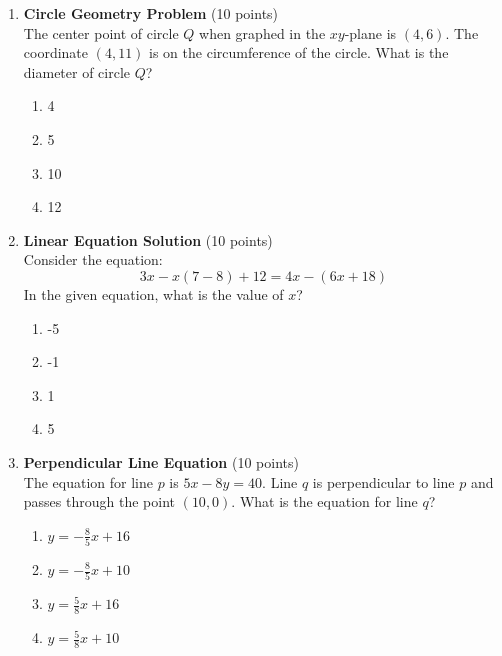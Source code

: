 \begin{enumerate}
  \item \textbf{Circle Geometry Problem} (10 points)\\
  The center point of circle $Q$ when graphed in the $xy$-plane is $(4,6)$. The coordinate $(4,11)$ is on the circumference of the circle. What is the diameter of circle $Q$?
  \begin{enumerate}[label=(\Alph*)]
    \item 4
    \item 5
    \item 10
    \item 12
  \end{enumerate}
  \begin{subanswer}
  \end{subanswer}

  \item \textbf{Linear Equation Solution} (10 points)\\
  Consider the equation:
  \[
    3 x-x(7-8)+12=4 x-(6 x+18)
  \]
  In the given equation, what is the value of $x$?
  \begin{enumerate}[label=(\Alph*)]
    \item -5
    \item -1
    \item 1
    \item 5
  \end{enumerate}
  \begin{subanswer}
  \end{subanswer}

  \item \textbf{Perpendicular Line Equation} (10 points)\\
  The equation for line $p$ is $5 x-8 y=40$. Line $q$ is perpendicular to line $p$ and passes through the point $(10,0)$. What is the equation for line $q$?
  \begin{enumerate}[label=(\Alph*)]
    \item $y=-\frac{8}{5} x+16$
    \item $y=-\frac{8}{5} x+10$
    \item $y=\frac{5}{8} x+16$
    \item $y=\frac{5}{8} x+10$
  \end{enumerate}
  \begin{subanswer}
  \end{subanswer}


\end{enumerate}
